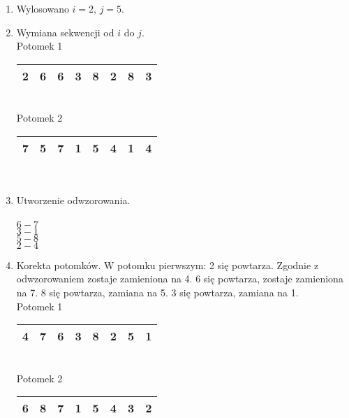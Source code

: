 \documentclass[12pt, a4paper]{article}
\begin{document}
\begin{enumerate}
 \item Wylosowano $i = 2$, $j = 5$.

 \item Wymiana sekwencji od $i$ do $j$. \\

Potomek 1
\begin{tabular}{ | c | c | c | c | c | c | c | c |}
  \hline
  2 & 6 & \cellcolor{blue!25}6 & \cellcolor{blue!25}3 & \cellcolor{blue!25}8 & \cellcolor{blue!25}2 & 8 & 3 \\ \hline
\end{tabular}\\
Potomek 2
\begin{tabular}{ | c | c | c | c | c | c | c | c |}
  \hline
  7 & 5 &  \cellcolor{green!25}7 & \cellcolor{green!25}1 & \cellcolor{green!25}5 & \cellcolor{green!25}4 & 1 & 4 \\ \hline
\end{tabular}\\

\item Utworzenie odwzorowania. \\\\
$6 - 7$\\
$3 - 1$\\
$5 - 8$\\
$2 - 4$\\

\item Korekta potomków. W potomku pierwszym: 2 się powtarza. Zgodnie z odwzorowaniem zostaje zamieniona na 4.
6 się powtarza, zostaje zamieniona na 7. 8 się powtarza, zamiana na 5. 3 się powtarza, zamiana na 1. \\

Potomek 1
\begin{tabular}{ | c | c | c | c | c | c | c | c |}
  \hline
  4 & 7 & \cellcolor{blue!25}6 & \cellcolor{blue!25}3 & \cellcolor{blue!25}8 & \cellcolor{blue!25}2 & 5 & 1 \\ \hline
\end{tabular}\\
Potomek 2
\begin{tabular}{ | c | c | c | c | c | c | c | c |}
  \hline
  6 & 8 &  \cellcolor{green!25}7 & \cellcolor{green!25}1 & \cellcolor{green!25}5 & \cellcolor{green!25}4 & 3 & 2 \\ \hline
\end{tabular}\\
\end{enumerate}
\end{document}
